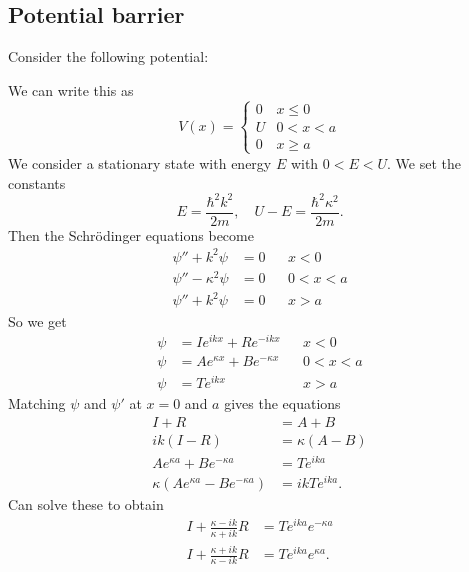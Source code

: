 \documentclass[a4paper]{article}
\begin{document}
\subsection{Potential barrier}
Consider the following potential:
\begin{center}
\end{center}
We can write this as
\[
  V(x) =
  \begin{cases}
    0 & x \leq 0\\
    U & 0 < x < a\\
    0 & x \geq a
  \end{cases}
\]
We consider a stationary state with energy $E$ with $0 < E < U$. We set the constants
\[
  E = \frac{\hbar^2 k^2}{2m},\quad U - E = \frac{\hbar^2\kappa^2}{2m}.
\]
Then the Schr\"odinger equations become
\begin{align*}
  \psi'' + k^2 \psi &= 0 && x < 0\\
  \psi'' - \kappa^2 \psi &= 0 && 0 < x < a\\
  \psi'' + k^2 \psi &= 0 && x > a
\end{align*}
So we get
\begin{align*}
  \psi &= I e^{ikx} + Re^{-ikx}&& x < 0\\
  \psi &= Ae^{\kappa x} + Be^{-\kappa x}&& 0 < x < a\\
  \psi &= Te^{ikx} && x > a
\end{align*}
Matching $\psi$ and $\psi'$ at $x = 0$ and $a$ gives the equations
\begin{align*}
  I + R &= A + B\\
  ik(I - R) &= \kappa (A - B)\\
  A e^{\kappa a} + Be^{-\kappa a} &= Te^{ika}\\
  \kappa(Ae^{\kappa a} - Be^{-\kappa a}) &= ik Te^{ika}.
\end{align*}
Can solve these to obtain
\begin{align*}
  I + \frac{\kappa - ik}{\kappa + ik}R &= Te^{ika} e^{-\kappa a}\\
  I + \frac{\kappa + ik}{\kappa - ik}R &= Te^{ika} e^{\kappa a}.
\end{align*}
\end{document}
